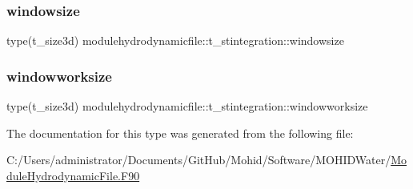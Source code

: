 \subsubsection{\texorpdfstring{windowsize}{windowsize}}
{\footnotesize\ttfamily type(t\+\_\+size3d) modulehydrodynamicfile\+::t\+\_\+stintegration\+::windowsize\hspace{0.3cm}{\ttfamily [private]}}

\mbox{\label{structmodulehydrodynamicfile_1_1t__stintegration_ae223f8d40d0e00f639c2e88ad0840c4c}} 
\subsubsection{\texorpdfstring{windowworksize}{windowworksize}}
{\footnotesize\ttfamily type(t\+\_\+size3d) modulehydrodynamicfile\+::t\+\_\+stintegration\+::windowworksize\hspace{0.3cm}{\ttfamily [private]}}



The documentation for this type was generated from the following file\+:\begin{DoxyCompactItemize}
\item 
C\+:/\+Users/administrator/\+Documents/\+Git\+Hub/\+Mohid/\+Software/\+M\+O\+H\+I\+D\+Water/\mbox{\hyperlink{_module_hydrodynamic_file_8_f90}{Module\+Hydrodynamic\+File.\+F90}}\end{DoxyCompactItemize}
